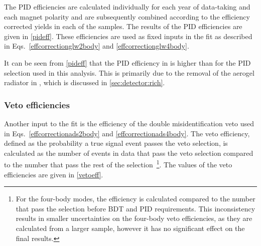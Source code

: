 The PID efficiencies are calculated individually for each year of data-taking and each magnet polarity and are subsequently combined according to the efficiency corrected yields in each of the samples. The results of the PID efficiencies are given in \tab\ref{pideff}. These efficiencies are used as fixed inputs in the \CP fit as described in Eqs.~\ref{effcorrectionglw2body} and \ref{effcorrectionglw4body}. 

\begin{table}[h]
\centering
{}
\caption{Summary of the PID efficiencies used in the \CP fit.}
\label{pideff}
\end{table}

It can be seen from \tab\ref{pideff} that the PID efficiency in \runtwo is higher than \runone for the PID selection used in this analysis. This is primarily due to the removal of the aerogel radiator in \runtwo, which is discussed in \sect\ref{sec:detector:rich}. 

\subsubsection{Veto efficiencies}
\label{sec:cpfit:efficiencies:veto}

Another input to the fit is the efficiency of the double misidentification veto used in Eqs.~\ref{effcorrectionads2body} and \ref{effcorrectionads4body}. The veto efficiency, defined as the probability a true signal event passes the veto selection, is calculated as the number of events in data that pass the veto selection compared to the number that pass the rest of the selection~\footnote{For the four-body modes, the efficiency is calculated compared to the number that pass the selection before BDT and PID requirements. This inconsistency results in smaller uncertainties on the four-body veto efficiencies, as they are calculated from a larger sample, however it has no significant effect on the final results.}. The values of the veto efficiencies are given in \tab\ref{vetoeff}.

